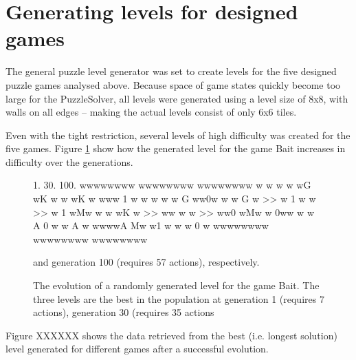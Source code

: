 \documentclass[a4paper,titlepage,final]{report}
\begin{document}
%






\section{Generating levels for designed games} 
\label{sec_task3evolvingLevelsResults}
The general puzzle level generator was set to create levels for the five designed puzzle games analysed above.
Because space of game states quickly become too large for the PuzzleSolver, all levels were generated using a level size of 8x8, with walls on all edges -- making the actual levels consist of only 6x6 tiles.

Even with the tight restriction, several levels of high difficulty was created for the five games.
Figure \ref{fig:lvlevolveprocess} show how the generated level for the game Bait increases in difficulty over the generations.


\begin{figure}[!ht]
\centering
\begin{vgdldesc}[linewidth=14cm]
1.          30.         100.
wwwwwwww    wwwwwwww    wwwwwwww
w  w w w    wG  wK w    w   wK w
www 1  w    w   w  w    w G ww0w
w w G  w >> w 1  w w >> w 1  wMw
w w wK w >> ww  w  w >> ww0  wMw
w  0ww w    w A  0 w    w A    w
wwwwA Mw    w1  w  w    w   0  w
wwwwwwww    wwwwwwww    wwwwwwww
\end{vgdldesc}
\caption{The evolution of a randomly generated level for the game Bait. The three levels are the best in the population at generation 1 (requires 7 actions), generation 30 (requires 35 actions} and generation 100 (requires 57 actions), respectively.
\label{fig:lvlevolveprocess}
\end{figure}


Figure XXXXXX shows the data retrieved from the best (i.e. longest solution) level generated for different games after a successful evolution.
\end{document}
